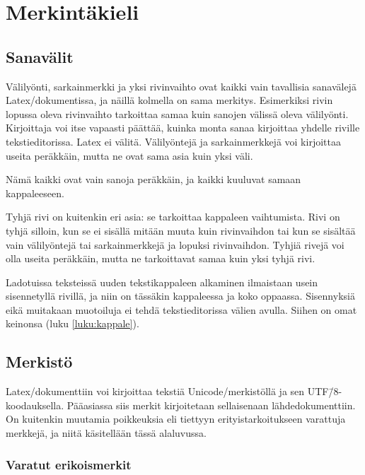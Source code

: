 \chapter{Merkintäkieli}

\section{Sanavälit}

Välilyönti, sarkainmerkki ja yksi rivinvaihto ovat kaikki vain
tavallisia sanavälejä Latex\-/dokumentissa, ja näillä kolmella on sama
merkitys. Esimerkiksi rivin lopussa oleva rivinvaihto tarkoittaa samaa
kuin sanojen välissä oleva välilyönti. Kirjoittaja voi itse vapaasti
päättää, kuinka monta sanaa kirjoittaa yhdelle riville tekstieditorissa.
Latex ei välitä. Välilyöntejä ja sarkainmerkkejä voi kirjoittaa useita
peräkkäin, mutta ne ovat sama asia kuin yksi väli.

\begin{koodilohkosis}
  Nämä      kaikki
       ovat            vain
  sanoja  peräkkäin,  ja      kaikki                kuuluvat
      samaan kappaleeseen.     
\end{koodilohkosis}

Tyhjä rivi on kuitenkin eri asia: se tarkoittaa kappaleen vaihtumista.
Rivi on tyhjä silloin, kun se ei sisällä mitään muuta kuin rivinvaihdon
tai kun se sisältää vain välilyöntejä tai sarkainmerkkejä ja lopuksi
rivinvaihdon. Tyhjiä rivejä voi olla useita peräkkäin, mutta ne
tarkoittavat samaa kuin yksi tyhjä rivi.

Ladotuissa teksteissä uuden tekstikappaleen alkaminen ilmaistaan usein
sisennetyllä rivillä, ja niin on tässäkin kappaleessa ja koko oppaassa.
Sisennyksiä eikä muitakaan muotoiluja ei tehdä tekstieditorissa välien
avulla. Siihen on omat keinonsa (luku \ref{luku:kappale}).

\section{Merkistö}

Latex\-/dokumenttiin voi kirjoittaa tekstiä Unicode\-/merkistöllä ja sen
UTF\=/8\/-koodauksella. Pääasiassa siis merkit kirjoitetaan sellaisenaan
lähdedokumenttiin. On kuitenkin muutamia poikkeuksia eli tiettyyn
erityistarkoitukseen varattuja merkkejä, ja niitä käsitellään tässä
alaluvussa.

\subsection{Varatut erikoismerkit}

